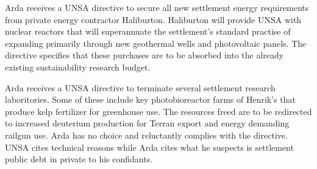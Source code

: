 Arda receives a UNSA directive to secure all new settlement energy requirements from private energy contractor Haliburton. Haliburton will provide UNSA with nuclear reactors that will superannuate the settlement's standard practise of expanding primarily through new geothermal wells and photovoltaic panels. The directive specifies that these purchases are to be absorbed into the already existing sustainability research budget.
\StopTimelineDate

Arda receives a UNSA directive to terminate several settlement research laboritories. Some of these include key photobioreactor farms of Henrik's that produce kelp fertilizer for greenhouse use. The resources freed are to be redirected to increased deuterium production for Terran export and energy demanding railgun use. Arda has no choice and reluctantly complies with the directive. UNSA cites technical reasons while Arda cites what he suspects is settlement public debt in private to his confidants.
\StopTimelineDate

